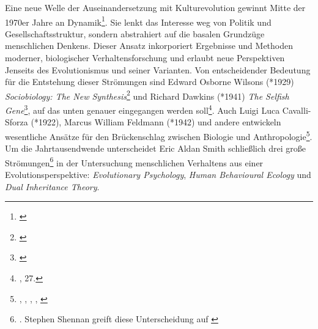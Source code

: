 \documentclass[openany,twoside,twocolumn]{book}
\let\rmarkdownfootnote\footnote%
\def\footnote{\protect\rmarkdownfootnote}
\begin{document}
Eine neue Welle der Auseinandersetzung mit Kulturevolution gewinnt Mitte
der 1970er Jahre an Dynamik\footnote{\textcite{creanza_cultural_2017}}.
Sie lenkt das Interesse weg von Politik und Gesellschaftsstruktur,
sondern abstrahiert auf die basalen Grundzüge menschlichen Denkens.
Dieser Ansatz inkorporiert Ergebnisse und Methoden moderner,
biologischer Verhaltensforschung und erlaubt neue Perspektiven Jenseits
des Evolutionismus und seiner Varianten. Von entscheidender Bedeutung
für die Entstehung dieser Strömungen sind Edward Osborne Wilsons (*1929)
\emph{Sociobiology: The New Synthesis}\footnote{\textcite{WilsonSociobiologynewsynthesis1975}}
und Richard Dawkins (*1941) \emph{The Selfish Gene}\footnote{\textcite{Dawkinsselfishgene1976}},
auf das unten genauer eingegangen werden soll\footnote{\textcite{SmithThreestylesevolutionary2000},
  27.}. Auch Luigi Luca Cavalli-Sforza (*1922), Marcus William Feldmann
(*1942) und andere entwickeln wesentliche Ansätze für den Brückenschlag
zwischen Biologie und Anthropologie\footnote{\textcite{alland_cultural_1972},
  \textcite{cavalli-sforza_models_1973}, \textcite{feldman_models_1975},
  \textcite{feldman_cultural_1976}, \textcite{blum_uncertainty_1978}}.
Um die Jahrtausendwende unterscheidet Eric Aldan Smith schließlich drei
große Strömungen\footnote{\textcite{SmithThreestylesevolutionary2000}.
  Stephen Shennan greift diese Unterscheidung auf
  \autocite[15-18.]{ShennanGenesmemeshuman2002}} in der Untersuchung
menschlichen Verhaltens aus einer Evolutionsperspektive:
\emph{Evolutionary Psychology}, \emph{Human Behavioural Ecology} und
\emph{Dual Inheritance Theory}.
\end{document}
